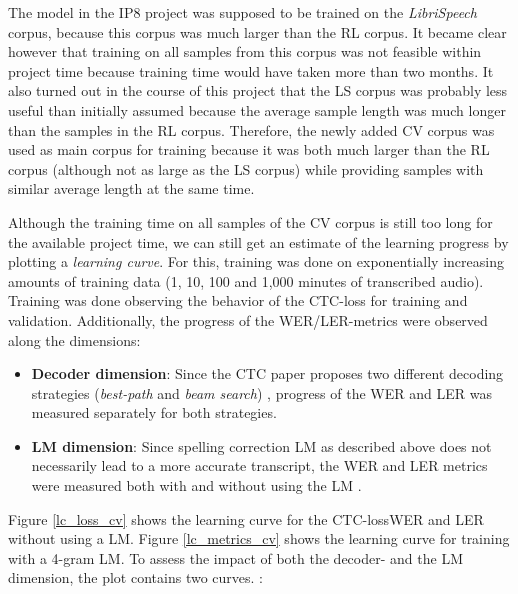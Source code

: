 The model in the IP8 project was supposed to be trained on the \textit{LibriSpeech} corpus, because this corpus was much larger than the \ac{RL} corpus. It became clear however that training on all samples from this corpus was not feasible within project time because training time would have taken more than two months. It also turned out in the course of this project that the \ac{LS} corpus was probably less useful than initially assumed because the average sample length was much longer than the samples in the \ac{RL} corpus. Therefore, the newly added \ac{CV} corpus was used as main corpus for training because it was both much larger than the \ac{RL} corpus (although not as large as the \ac{LS} corpus) while providing samples with similar average length at the same time.

Although the training time on all samples of the \ac{CV} corpus is still too long for the available project time, we can still get an estimate of the learning progress by plotting a \textit{learning curve}. For this, training was done on exponentially increasing amounts of training data (1, 10, 100 and 1,000 minutes of transcribed audio). Training was done observing the behavior of the \ac{CTC}-loss for training and validation. Additionally, the progress of the \ac{WER}/\ac{LER}-metrics were observed along the dimensions:

\begin{itemize}
	\item \textbf{Decoder dimension}: Since the \ac{CTC} paper proposes two different decoding strategies (\textit{best-path} and \textit{beam search}) \cite{ctc_paper}, progress of the \ac{WER} and \ac{LER} was measured separately for both strategies.
	\item \textbf{LM dimension}: Since spelling correction \ac{LM} as described above does not necessarily lead to a more accurate transcript, the \ac{WER} and \ac{LER} metrics were measured both with and without using the \ac{LM} .
\end{itemize}

Figure \ref{lc_loss_cv} shows the learning curve for the \ac{CTC}-loss\ac{WER} and \ac{LER} without using a \ac{LM}. Figure \ref{lc_metrics_cv} shows the learning curve for training with a 4-gram \ac{LM}. To assess the impact of both the decoder- and the \ac{LM} dimension, the plot contains two curves.
: 

